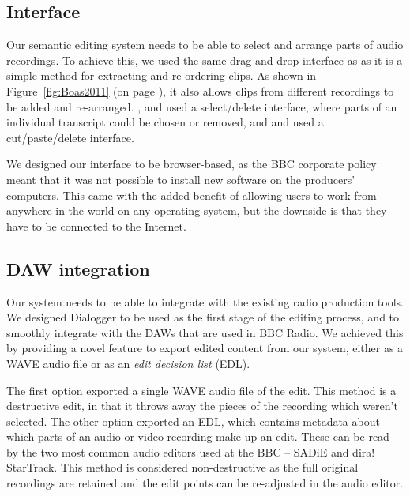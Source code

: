
\subsection{Interface}

Our semantic editing system needs to be able to select and arrange parts of audio recordings. To achieve this, we used
the same drag-and-drop interface as \citet{Hyperaudio2016} as it is a simple method for extracting and re-ordering
clips. As shown in Figure~\ref{fig:Boas2011} (on page \pageref{fig:Boas2011}), it also allows clips from different
recordings to be added and re-arranged. \citet{Casares2002}, \citet{Sivaraman2016} and \citet{Berthouzoz2012} used a
select/delete interface, where parts of an individual transcript could be chosen or removed, and \citet{Whittaker2004}
and \citet{Rubin2013} used a cut/paste/delete interface.

We designed our interface to be browser-based, as the BBC corporate policy meant that it was not possible to install
new software on the producers' computers. This came with the added benefit of allowing users to work from anywhere in
the world on any operating system, but the downside is that they have to be connected to the Internet.

\subsection{DAW integration}

Our system needs to be able to integrate with the existing radio production tools. We designed Dialogger to be used as
the first stage of the editing process, and to smoothly integrate with the DAWs that are used in BBC Radio. We achieved
this by providing a novel feature to export edited content from our system, either as a WAVE audio file or as an
\textit{edit decision list} (EDL).

The first option exported a single WAVE audio file of the edit. This method is a destructive edit, in that it
throws away the pieces of the recording which weren't selected.  The other option exported an EDL, which contains
metadata about which parts of an audio or video recording make up an edit. These can be read by the two most common
audio editors used at the BBC -- SADiE and dira! StarTrack.  This method is considered non-destructive as the full
original recordings are retained and the edit points can be re-adjusted in the audio editor.


